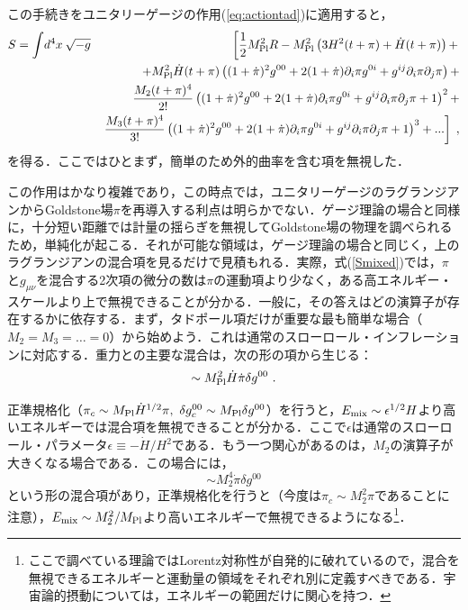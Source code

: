 この手続きをユニタリーゲージの作用(\ref{eq:actiontad})に適用すると，
\begin{eqnarray}\label{Smixed}
S = \int \! d^4 x  \: \sqrt{- g} &&\left[\frac{1}{2}M_{\rm Pl}^2 R
- M^2_{\rm Pl} \left(3H^2(t+\pi) +\dot{H}(t+\pi)\right)+ \right.\\ \nonumber
&&+M^2_{\rm
Pl} \dot{H}(t+\pi)\left(
(1+\dot\pi)^2g^{00}+2(1+\dot\pi)\partial_i\pi g^{0i}+
g^{ij}\partial_i\pi\partial_j\pi\right) + \\ \nonumber
&&\frac{M_2(t+\pi)^4}{2!}\left(
(1+\dot\pi)^2g^{00}+2(1+\dot\pi)\partial_i\pi g^{0i}+
g^{ij}\partial_i\pi\partial_j\pi+1\right)^2 + \nonumber\\
\nonumber && \left. \frac{M_3(t+\pi)^4}{3!}\left(
(1+\dot\pi)^2g^{00}+2(1+\dot\pi)\partial_i\pi g^{0i}+
g^{ij}\partial_i\pi\partial_j\pi+1\right)^3+ ... \right] \; ,
\end{eqnarray}
を得る．ここではひとまず，簡単のため外的曲率を含む項を無視した．

この作用はかなり複雑であり，この時点では，ユニタリーゲージのラグランジアンからGoldstone場$\pi$を再導入する利点は明らかでない．ゲージ理論の場合と同様に，十分短い距離では計量の揺らぎを無視してGoldstone場の物理を調べられるため，単純化が起こる．それが可能な領域は，ゲージ理論の場合と同じく，上のラグランジアンの混合項を見るだけで見積もれる．実際，式(\ref{Smixed})では，$\pi$と$g_{\mu\nu}$を混合する2次項の微分の数は$\pi$の運動項より少なく，ある高エネルギー・スケールより上で無視できることが分かる．一般に，その答えはどの演算子が存在するかに依存する．まず，タドポール項だけが重要な最も簡単な場合（$M_2=M_3=\ldots=0$）から始めよう．これは通常のスローロール・インフレーションに対応する．重力との主要な混合は，次の形の項から生じる：
\begin{equation}
\sim M_{\rm Pl}^2 \dot H \dot\pi \delta g^{00} \ .
\end{equation}

正準規格化（$\pi_c\sim M_{\rm Pl} \dot H^{1/2}\pi,\  \delta g_c^{00}\sim M_{\rm Pl} \delta g^{00}$）を行うと，$E_{\rm mix}\sim \epsilon^{1/2} H$より高いエネルギーでは混合項を無視できることが分かる．ここで$\epsilon$は通常のスローロール・パラメータ$\epsilon\equiv -\dot H/H^2$である．もう一つ関心があるのは，$M_2$の演算子が大きくなる場合である．この場合には，
\begin{equation}
\sim M_2^4 \dot \pi \delta g^{00}
\end{equation}
という形の混合項があり，正準規格化を行うと（今度は$\pi_c\sim M_2^2\pi$であることに注意），$E_{\rm mix}\sim M_2^2/M_{\rm Pl}$より高いエネルギーで無視できるようになる\footnote{ここで調べている理論ではLorentz対称性が自発的に破れているので，混合を無視できるエネルギーと運動量の領域をそれぞれ別に定義すべきである．宇宙論的摂動については，エネルギーの範囲だけに関心を持つ．}．

